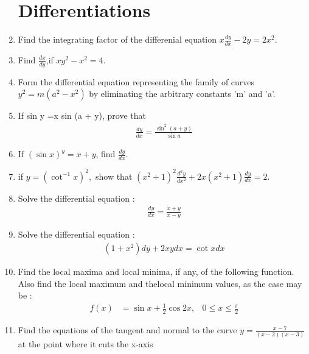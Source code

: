 \begin{enumerate}
\section{\textbf{Differentiations}}
\item Find the integrating factor of the differenial equation $x \frac{d
    y}{dx} - 2y = 2x^2.$
\item Find $\frac{dx}{dy}$,if $xy^2-x^2 = 4$.
\item Form the differential equation representing the family of curves $y^2 = m(a^2 - x^2)$ by eliminating the arbitrary constants 'm' and 'a'.
\item If sin y =x sin (a + y), prove that
\begin{align*}
     \frac{dy}{dx} = \frac{\sin^{2}(a+y)}{\sin a}
\end{align*}
\item If $(\sin x)^y = x + y$, find $\frac{dy}{dx}.$
\item if $y = {(\cot^{-1}x)^2},$ show that ${(x^2 + 1)}^{2}\frac{d^{2}y}{dx^{2}} + 2x{(x^2 + 1)}\frac{dy}{dx} = 2.$
\item Solve the differential equation :
\begin{align*}
	\frac{dy}{dx} = \frac{x + y}{x - y}
\end{align*}
\item Solve the differential equation :
\begin{align*}
	(1 + x^{2})dy + 2xy dx = \cot x dx
\end{align*}
\item Find the local maxima and local minima, if any, of the following function. Also find the local maximum and thelocal minimum values, as the case may be :
	\begin{align*}
		f(x) &= \sin x + \frac{1}{2} \cos 2x, & 0 \leq x \leq \frac{\pi}{2}
	\end{align*}
\item Find the equations of the tangent and normal to the 
curve $y = \frac{x - 7}{(x - 2)(x - 3)}$ at the point where it cuts the x-axis
\end{enumerate}
